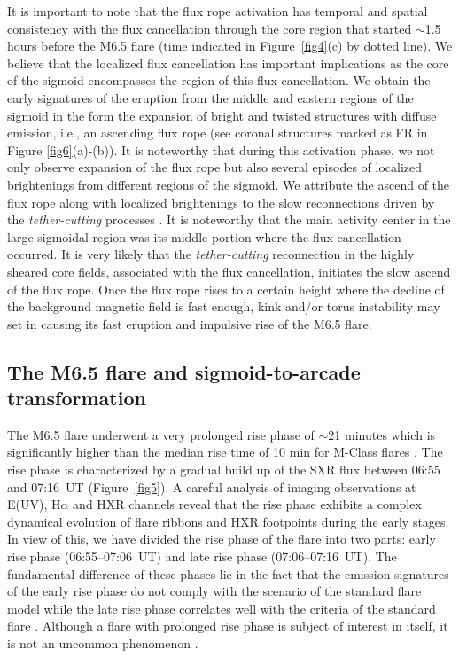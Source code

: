 \documentclass[twocolumn]{aastex6}
\begin{document}
{It is important to note that the flux rope activation has temporal and spatial consistency with the flux cancellation through the core region that started $\sim$1.5 hours before the M6.5 flare (time indicated in Figure~\ref{fig4}(c) by dotted line). We believe that the localized flux cancellation has important implications as the core of the sigmoid encompasses the region of this flux cancellation. We obtain the early signatures of the eruption from the middle and eastern regions of the sigmoid in the form the expansion of bright and twisted structures with diffuse emission, i.e., an ascending flux rope (see coronal structures marked as FR in Figure \ref{fig6}(a)-(b)). It is noteworthy that during this activation phase, we not only observe expansion of the flux rope but also several episodes of localized brightenings from different regions of the sigmoid. We attribute the ascend of the flux rope along with localized brightenings to the slow reconnections driven by the {\it tether-cutting} processes \citep{Moore1992}. It is noteworthy that the main activity center in the large sigmoidal region was its middle portion where the flux cancellation occurred. It is very likely that the {\it tether-cutting} reconnection in the highly sheared core fields, associated with the flux cancellation, initiates the slow ascend of the flux rope. 
Once the flux rope rises to a certain height where the decline of the background magnetic field is fast enough, kink and/or torus instability may set in \citep{Torok2005, Kliem2006} causing its fast eruption and impulsive rise of the M6.5 flare.

\subsection{The M6.5 flare and sigmoid-to-arcade transformation}


The M6.5 flare underwent a very prolonged rise phase of $\sim$21 minutes which is significantly higher than the median rise time of 10 min for M-Class flares \citep{Veronig2002}. The rise phase is characterized by a gradual build up of the SXR flux between 06:55 and 07:16~UT (Figure~\ref{fig5}). A careful analysis of imaging observations at E(UV), H$\alpha$ and HXR channels reveal that the rise phase exhibits a complex dynamical evolution of flare ribbons and HXR footpoints during the early stages. In view of this, we have divided the rise phase of the flare into two parts: early rise phase (06:55--07:06~UT) and late rise phase (07:06--07:16~UT). The fundamental difference of these phases lie in the fact that the emission signatures of the early rise phase do not comply with the scenario of the standard flare model while the late rise phase correlates well with the criteria of the standard flare \citep[see, e.g., ][]{Joshi2012}. Although a flare with prolonged rise phase is subject of interest in itself, it is not an uncommon phenomenon \citep[see, e.g.,][]{Bak-Steslicka2011}.

}
\end{document}
